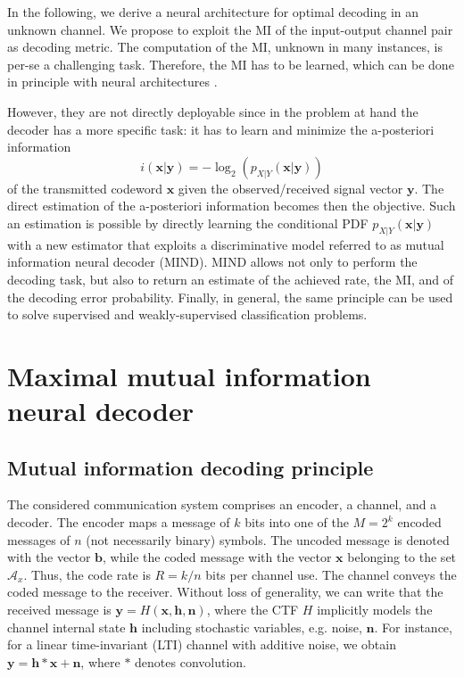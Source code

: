 In the following, we derive a neural architecture for optimal decoding in an unknown channel. We propose to exploit the MI of the input-output channel pair as decoding metric. The computation of the MI, unknown in many instances, is per-se a challenging task. Therefore, the MI has to be learned, which can be done in principle with neural architectures \cite{Mine2018, Wunder2019, Song2020, f-DIME}. 

However, they are not directly deployable since in the problem at hand the decoder has a more specific task: it has to learn and minimize the a-posteriori information
\begin{equation}
    i(\mathbf{x|y}) = -\log_2{(p_{X|Y}(\mathbf{x}|\mathbf{y}))}
\end{equation}
of the transmitted codeword $\mathbf{x}$ given the observed/received signal vector $\mathbf{y}$. The direct estimation of the a-posteriori information becomes then the objective. Such an estimation is possible by directly learning the conditional PDF $p_{X|Y}(\mathbf{x}|\mathbf{y})$ with a new estimator that exploits a discriminative model referred to as mutual information neural decoder (MIND). MIND allows not only to perform the decoding task, but also to return an estimate of the achieved rate, the MI, and of the decoding error probability. Finally, in general, the same principle can be used to solve supervised \cite{pmlr-v235-novello24a} and weakly-supervised \cite{novello2024label} classification problems.

\section{Maximal mutual information neural decoder}
\label{sec:mind}

\subsection{Mutual information decoding principle}
\label{subsec:mind_mid}

The considered communication system comprises an encoder, a channel, and a decoder. The encoder maps a message of $k$ bits into one of the $M=2^k$ encoded messages of $n$ (not necessarily binary) symbols. The uncoded message is denoted with the vector $\mathbf{b}$, while the coded message with the vector $\mathbf{x}$ belonging to the set $\mathcal{A}_x$. Thus, the code rate is $R=k/n$ bits per channel use. The channel conveys the coded message to the receiver. Without loss of generality, we can write that the received message is $\mathbf{y}=H(\mathbf{x},\mathbf{h},\mathbf{n})$, where the CTF $H$ implicitly models the channel internal state $\mathbf{h}$ including stochastic variables, e.g. noise, $\mathbf{n}$. For instance, for a linear time-invariant (LTI) channel with additive noise, we obtain $\mathbf{y}=\mathbf{h}*\mathbf{x}+\mathbf{n}$, where $*$ denotes convolution.

